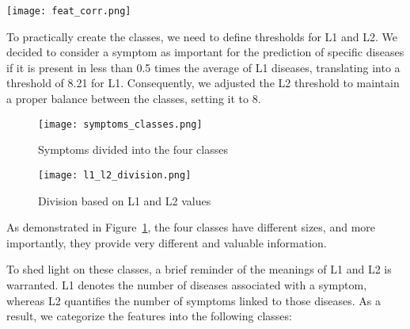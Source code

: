 \begin{figure*}[!t]
    \centering
    \texttt{[image: feat\_corr.png]}
    \caption{Correlation between features}
    \label{fig:feat_corr}
\end{figure*}

To practically create the classes, we need to define thresholds for L1 and L2. We decided to consider
a symptom as important for the prediction of specific diseases if it is present in less than 0.5 times the average of L1 diseases,
translating into a threshold of 8.21 for L1. Consequently, we adjusted the L2 threshold to maintain a proper balance
between the classes, setting it to 8.

\begin{figure}[H]
    \centering
    \texttt{[image: symptoms\_classes.png]}
    \caption{Symptoms divided into the four classes}
    \label{fig:symptoms_classes}
\end{figure}

\begin{figure}[H]
    \centering
    \texttt{[image: l1\_l2\_division.png]}
    \caption{Division based on L1 and L2 values}
    \label{fig:l1_l2_division}
\end{figure}
\noindent


\noindent
As demonstrated in Figure~\ref{fig:symptoms_classes}, the four classes have different sizes, and more importantly,
they provide very different and valuable information.

To shed light on these classes, a brief reminder of the meanings of L1 and L2 is warranted. L1 denotes the number
of diseases associated with a symptom, whereas L2 quantifies the number of symptoms linked to those diseases.
As a result, we categorize the features into the following classes:\\

